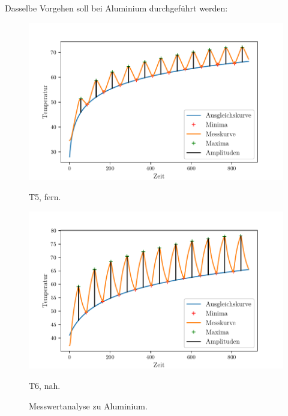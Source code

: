 Dasselbe Vorgehen soll bei Aluminium durchgeführt werden:
\begin{figure}
    \centering
    \begin{minipage}{.5\textwidth}
        \centering
        \includegraphics[max width=1.1\linewidth]{plots/amplitudes_aluminum_far(t5).pdf}
        \caption{T5, fern.}
        \label{fig:plot_amps_t5}
    \end{minipage}%
    \begin{minipage}{.5\textwidth}
        \centering
        \includegraphics[max width=1.1\linewidth]{plots/amplitudes_aluminum_close(t6).pdf}
        \caption{T6, nah.}
        \label{fig:plot_amps_t6}
    \end{minipage}
    \caption{Messwertanalyse zu Aluminium.}
    \label{fig:plots_amps_t5_t6}
\end{figure}
